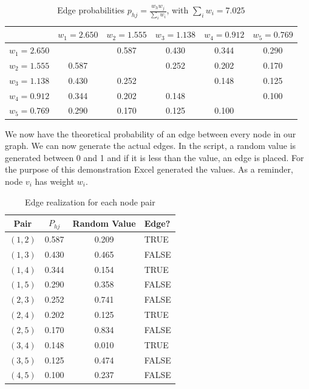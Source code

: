 \documentclass[12pt, a4paper]{article}   %
\begin{document}
\begin{table}[htbp]
  \centering
  \label{tab:calculated-probabilities-step-2}
  \begin{tabular}{c S[table-format=1.3] S[table-format=1.3] S[table-format=1.3] S[table-format=1.3] S[table-format=1.3]}
    \toprule
    {} & {\(w_1 = 2.650\)} & {\(w_2 = 1.555\)} & {\(w_3 = 1.138\)} & {\(w_4 = 0.912\)} & {\(w_5 = 0.769\)} \\
    \midrule
    \(w_1 = 2.650\) & {}    & 0.587 & 0.430 & 0.344 & 0.290 \\
    \(w_2 = 1.555\) & 0.587 & {}    & 0.252 & 0.202 & 0.170 \\
    \(w_3 = 1.138\) & 0.430 & 0.252 & {}    & 0.148 & 0.125 \\
    \(w_4 = 0.912\) & 0.344 & 0.202 & 0.148 & {}    & 0.100 \\
    \(w_5 = 0.769\) & 0.290 & 0.170 & 0.125 & 0.100 & {}    \\
    \bottomrule
  \end{tabular}
  \caption{Edge probabilities \(p_{hj} = \frac{w_h w_j}{\sum_i w_i}\), with \(\sum_i w_i = 7.025\)}
\end{table}

We now have the theoretical probability of an edge between every node in our graph.
We can now generate the actual edges. In the script, a random value is generated between 0 and 1 and if it is less than the value, an edge is placed. For the purpose of this demonstration Excel generated the values. As a reminder, node \(v_i \) has weight \(w_i\).

\begin{table}[H]
  \centering
  \label{tab:edge-realization-2}
  \begin{tabular}{c S[table-format=1.3] c l}
    \toprule
    {Pair} & {\(P_{hj}\)} & {Random Value} & {Edge?} \\
    \midrule
    \((1,2)\) & 0.587 & 0.209 & TRUE  \\
    \((1,3)\) & 0.430 & 0.465 & FALSE \\
    \((1,4)\) & 0.344 & 0.154 & TRUE  \\
    \((1,5)\) & 0.290 & 0.358 & FALSE \\
    \((2,3)\) & 0.252 & 0.741 & FALSE \\
    \((2,4)\) & 0.202 & 0.125 & TRUE  \\
    \((2,5)\) & 0.170 & 0.834 & FALSE \\
    \((3,4)\) & 0.148 & 0.010 & TRUE  \\
    \((3,5)\) & 0.125 & 0.474 & FALSE \\
    \((4,5)\) & 0.100 & 0.237 & FALSE \\

    \bottomrule
  \end{tabular}
  \caption{Edge realization for each node pair}
\end{table}
\end{document}
